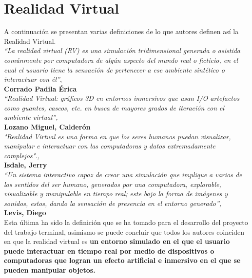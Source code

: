\section{Realidad Virtual}
A continuación se presentan varias definiciones de lo que autores definen así la Realidad Virtual.\\
\newline
\textit{“La realidad virtual (RV) es una simulación tridimensional generada o asistida comúnmente por computadora de algún aspecto del mundo real o ficticio, en el cual 
el usuario tiene la sensación de pertenecer a ese ambiente sintético o interactuar con él”}\cite{web6},\\ 
\textbf{Corrado Padila Érica}\\
\newline
\textit{“Realidad Virtual: gráficos 3D en entornos inmersivos que usan I/O
artefactos como guantes, cascos, etc. en busca de mayores grados de iteración
con el ambiente virtual”\cite{web7},}\\ 
\textbf{Lozano Miguel, Calderón}\\
\newline
\textit{"Realidad Virtual es una forma en que los seres humanos puedan
visualizar, manipular e interactuar con las computadoras y datos extremadamente
complejos".\cite{web8},}\\
\textbf{Isdale, Jerry}\\
\newline
\textit{“Un sistema interactivo capaz de crear una simulación que implique a varios de los sentidos del ser humano, generados por una computadora, explorable, visualizable y manipulable 
en tiempo real; este bajo la forma de imágenes y sonidos, estos, dando la sensación de presencia en el entorno generado”\cite{web9},}\\
\textbf{Levis, Diego}\\
\newline
Esta última ha sido la definición que se ha tomado para el desarrollo del proyecto del trabajo terminal, asimismo se puede concluir que todos los autores coinciden en que la 
realidad virtual es \textbf{un entorno simulado en el que el usuario puede interactuar en tiempo real por medio
de dispositivos o computadoras que logran un efecto artificial e inmersivo en el que se pueden manipular objetos.}

